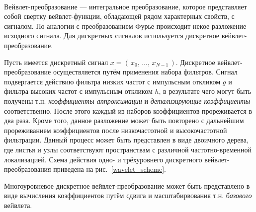 \documentclass[12pt,a4paper,oneside,fleqn,leqno]{article}
\newcounter{pe} %
\newcommand*{\Nep}{\addtocounter{pe}{1}{\arabic{pe}$^{\circ}$.\;}}
\newcommand*{\NepS}{\mbox{} \\ \Nep}
\begin{document}
	\NepS {\bf Вейвлет-преобразование}
	\par Вейвлет-преобразование — интегральное преобразование, которое представляет собой свертку вейвлет-функции, обладающей рядом характерных свойств, с сигналом. По аналогии с преобразованием Фурье происходит некое разложение исходного сигнала. Для дискретных сигналов используется дискретное вейвлет-преобразование.
	\par Пусть имеется дискретный сигнал $x = (\, x_0, \, \ldots, \, x_{N-1}\, )$. Дискретное вейвлет-преобразование осуществляется путём применения набора фильтров. Сигнал подвергается действию фильтра низких частот с импульсным откликом $g$ и фильтра высоких частот с импульсным откликом $h$, в результате чего могут быть получены т.н. {\it коэффициенты аппроксимации} и {\it детализирующие коэффициенты} соответственно. После этого каждый из наборов коэффициентов прореживается в два раза. Кроме того, данное разложение может быть повторено с дальнейшим прореживанием коэффициентов после низкочастотной и высокочастотной фильтрации. Данный процесс может быть представлен в виде двоичного дерева, где листья и узлы соответствуют пространствам с различной частотно-временной локализацией. Схема действия одно- и трёхуровнего дискретного вейвлет-преобразования приведена на рис.~\ref{wavelet_scheme}.
	\par Многоуровневое дискретное вейвлет-преобразование может быть представлено в виде вычисления коэффициентов путём сдвига и масштабирвования т.н. {\it базового} вейвлета.
\end{document}
